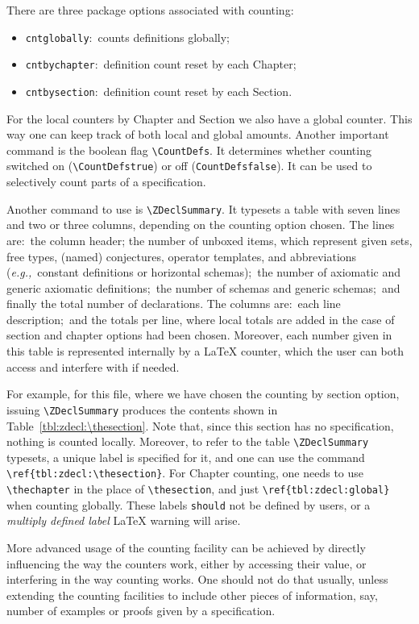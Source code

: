 \documentclass{article}
\begin{document}
There are three package options associated with counting:
%
\begin{itemize}
   \item \texttt{cntglobally}:~counts definitions globally;
   \item \texttt{cntbychapter}:~definition count reset by each Chapter;
   \item \texttt{cntbysection}:~definition count reset by each Section.
\end{itemize}
%
For the local counters by Chapter and Section we also have a global counter.
This way one can keep track of both local and global amounts. Another important
command is the boolean flag \verb|\CountDefs|. It determines whether counting
switched on (\verb|\CountDefstrue|) or off (\verb|CountDefsfalse|). It can be
used to selectively count parts of a specification.

Another command to use is \verb|\ZDeclSummary|. It typesets a table
with seven lines and two or three columns, depending on the counting
option chosen. The lines are:~the column header; the number of
unboxed items, which represent given sets, free types, (named) conjectures,
operator templates, and abbreviations (\textit{e.g.,}~constant definitions
or horizontal schemas);~the number of axiomatic and generic axiomatic
definitions;~the number of schemas and generic schemas;~and finally the
total number of declarations. The columns are:~each line description;~and
the totals per line, where local totals are added in the case of section
and chapter options had been chosen. Moreover, each number given in this
table is represented internally by a \LaTeX{} counter, which the user can
both access and interfere with if needed.

For example, for this file, where we have chosen the counting by section option,
issuing \verb|\ZDeclSummary| produces the contents shown in Table~\ref{tbl:zdecl:\thesection}.
%
\ZDeclSummary
%
Note that, since this section has no specification, nothing is counted locally.
Moreover, to refer to the table \verb|\ZDeclSummary| typesets, a unique label
is specified for it, and one can use the command \verb|\ref{tbl:zdecl:\thesection}|.
For Chapter counting, one needs to use \verb|\thechapter| in the place of \verb|\thesection|,
and just \verb|\ref{tbl:zdecl:global}| when counting globally. These labels \texttt{should}
not be defined by users, or a \textit{multiply defined label} \LaTeX{} warning will arise.

More advanced usage of the counting facility can be achieved by directly
influencing the way the counters work, either by accessing their value,
or interfering in the way counting works. One should not do that usually,
unless extending the counting facilities to include other pieces of information,
say, number of examples or proofs given by a specification.
\end{document}
